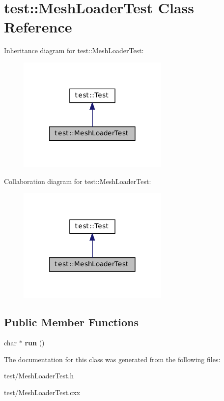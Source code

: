 \hypertarget{classtest_1_1_mesh_loader_test}{
\section{test::MeshLoaderTest Class Reference}
\label{classtest_1_1_mesh_loader_test}
}


Inheritance diagram for test::MeshLoaderTest:\nopagebreak
\begin{figure}[H]
\begin{center}
\leavevmode
\includegraphics[width=210pt]{classtest_1_1_mesh_loader_test__inherit__graph}
\end{center}
\end{figure}


Collaboration diagram for test::MeshLoaderTest:\nopagebreak
\begin{figure}[H]
\begin{center}
\leavevmode
\includegraphics[width=210pt]{classtest_1_1_mesh_loader_test__coll__graph}
\end{center}
\end{figure}
\subsection*{Public Member Functions}
\begin{DoxyCompactItemize}
\item 
\hypertarget{classtest_1_1_mesh_loader_test_ac8c3d05f4f14e770e64d27a79f18633b}{
char $\ast$ {\bfseries run} ()}
\label{classtest_1_1_mesh_loader_test_ac8c3d05f4f14e770e64d27a79f18633b}

\end{DoxyCompactItemize}


The documentation for this class was generated from the following files:\begin{DoxyCompactItemize}
\item 
test/MeshLoaderTest.h\item 
test/MeshLoaderTest.cxx\end{DoxyCompactItemize}
